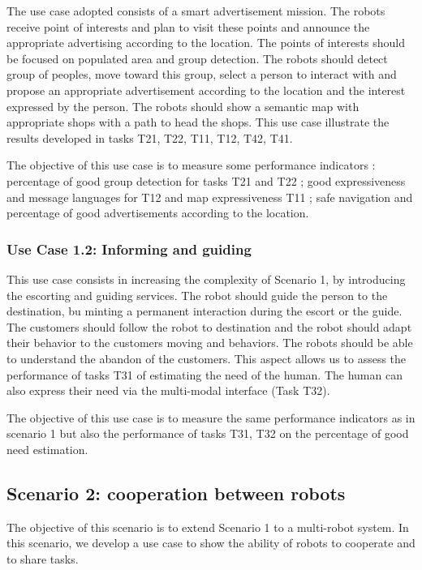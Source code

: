 The use case adopted consists of a smart advertisement mission. The robots receive point of interests and plan to visit these points and announce the appropriate advertising according to the location. The points of interests should be focused on populated area and group detection. The robots should detect group of peoples, move toward this group, select a person to interact with and propose an appropriate advertisement according to the location and the interest expressed by the person. The robots should show a semantic map with appropriate shops with a path to head the shops. This use case illustrate the results developed in tasks T21, T22, T11, T12, T42, T41. 

The objective of this use case is to measure some performance indicators : percentage of good group detection for tasks T21 and T22 ; good expressiveness and message languages for T12 and map expressiveness T11 ; safe navigation and percentage of good advertisements according to the location. 

\subsubsection*{Use Case 1.2: Informing and guiding}

This use case consists in increasing the complexity of Scenario 1, by introducing the escorting and guiding services. The robot should guide the person to the destination, bu minting a permanent interaction during the escort or the guide. The customers should follow the robot to destination and the robot should adapt their behavior to the customers moving and behaviors.  The robots should be able to understand the abandon of the customers. This aspect allows us to assess the performance of  tasks T31 of estimating the need of the human. The human can also express their need via the multi-modal interface (Task T32).

The objective of this use case is to measure the same performance indicators as in scenario 1 but also the performance of tasks T31, T32 on the percentage of good need estimation. 

\subsection {Scenario 2: cooperation between robots}
The objective of this scenario is to extend Scenario 1 to a multi-robot system. In this scenario, we develop a use case to show the ability of robots to cooperate and to share tasks. 

